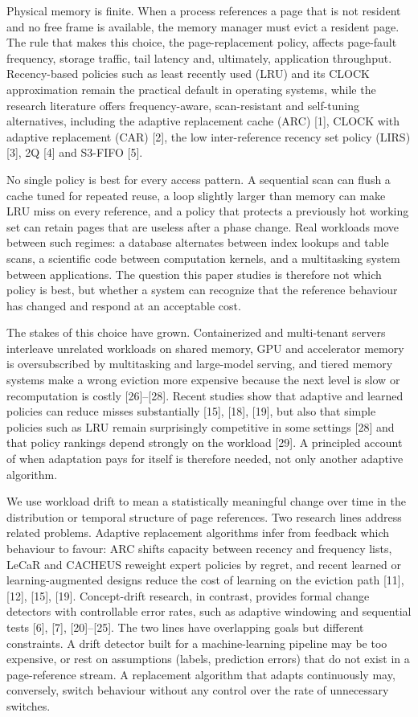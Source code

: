 \documentclass[10pt,twocolumn,a4paper]{IEEEtran}
\begin{document}
Physical memory is finite. When a process references a page that is not
resident and no free frame is available, the memory manager must evict a
resident page. The rule that makes this choice, the page-replacement policy,
affects page-fault frequency, storage traffic, tail latency and, ultimately,
application throughput. Recency-based policies such as least recently used
(LRU) and its CLOCK approximation remain the practical default in operating
systems, while the research literature offers frequency-aware, scan-resistant
and self-tuning alternatives, including the adaptive replacement cache (ARC)
[1], CLOCK with adaptive replacement (CAR) [2], the low inter-reference recency
set policy (LIRS) [3], 2Q [4] and S3-FIFO [5].

No single policy is best for every access pattern. A sequential scan can
flush a cache tuned for repeated reuse, a loop slightly larger than memory can
make LRU miss on every reference, and a policy that protects a previously hot
working set can retain pages that are useless after a phase change. Real
workloads move between such regimes: a database alternates between index
lookups and table scans, a scientific code between computation kernels, and a
multitasking system between applications. The question this paper studies is
therefore not which policy is best, but whether a system can recognize that
the reference behaviour has changed and respond at an acceptable cost.

The stakes of this choice have grown. Containerized and multi-tenant servers
interleave unrelated workloads on shared memory, GPU and accelerator memory is
oversubscribed by multitasking and large-model serving, and tiered memory
systems make a wrong eviction more expensive because the next level is slow or
recomputation is costly [26]--[28]. Recent studies show that adaptive and
learned policies can reduce misses substantially [15], [18], [19], but also
that simple policies such as LRU remain surprisingly competitive in some
settings [28] and that policy rankings depend strongly on the workload [29]. A
principled account of when adaptation pays for itself is therefore needed, not
only another adaptive algorithm.

We use workload drift to mean a statistically meaningful change over time in
the distribution or temporal structure of page references. Two research lines
address related problems. Adaptive replacement algorithms infer from feedback
which behaviour to favour: ARC shifts capacity between recency and frequency
lists, LeCaR and CACHEUS reweight expert policies by regret, and recent learned
or learning-augmented designs reduce the cost of learning on the eviction path
[11], [12], [15], [19]. Concept-drift research, in contrast, provides formal
change detectors with controllable error rates, such as adaptive windowing and
sequential tests [6], [7], [20]--[25]. The two lines have overlapping goals
but different constraints. A drift detector built for a machine-learning
pipeline may be too expensive, or rest on assumptions (labels, prediction
errors) that do not exist in a page-reference stream. A replacement algorithm
that adapts continuously may, conversely, switch behaviour without any control
over the rate of unnecessary switches.
\end{document}
